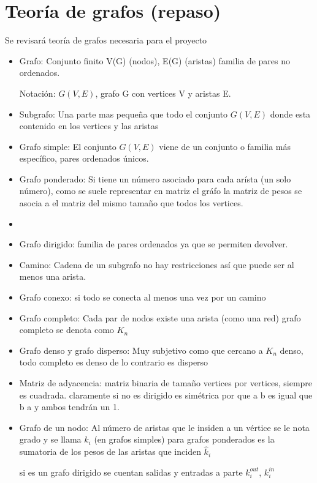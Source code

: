 \documentclass[12pt,twoside]{book}
\begin{document}
\chapter{Teoría de grafos (repaso)}

Se revisará teoría de grafos necesaria para el proyecto

\begin{itemize}
\item{Grafo: } Conjunto finito V(G) (nodos), E(G) (aristas) familia de pares no ordenados. 

Notación: $G(V,E)$, grafo G con vertices V y aristas E.

\item{Subgrafo:} Una parte mas pequeña que todo el conjunto $G(V, E)$ donde esta contenido en los vertices y las aristas

\item{Grafo simple:} El conjunto $G(V,E)$ viene de un conjunto o familia más específico, pares ordenados únicos.

\item{Grafo ponderado:} Si tiene un número asociado para cada arísta (un solo número), como se suele representar en matriz el gráfo la matriz de pesos se asocia a el matriz del mismo tamaño que todos los vertices.
\item 
\item{Grafo dirigido:} familia de pares ordenados ya que se permiten devolver.

\item{Camino:} Cadena de un subgrafo no hay restricciones así que puede ser al menos una arista. 
\item{Grafo conexo:} si todo se conecta al menos una vez por un camino
\item{Grafo completo:} Cada par de nodos existe una arista (como una red) grafo completo se denota como $K_n$
\item{Grafo denso y grafo disperso:} Muy subjetivo como que cercano a $K_n$ denso, todo completo es denso de lo contrario es disperso
\item{Matriz de adyacencia:} matriz binaria de tamaño vertices por vertices, siempre es cuadrada. claramente si no es dirigido es simétrica por que a b es igual que b a y ambos tendrán un 1.


\item{Grafo de un nodo:} Al número de aristas que le insiden a un vértice se le nota grado y se llama $k_i$ (en grafos simples)
para grafos ponderados es la sumatoria de los pesos de las aristas que inciden $\hat{k}_i$ 

si es un grafo dirigido se cuentan salidas y entradas a parte $k^{out}_{i}$, $k^{in}_{i}$

\end{itemize}    
\end{document}
